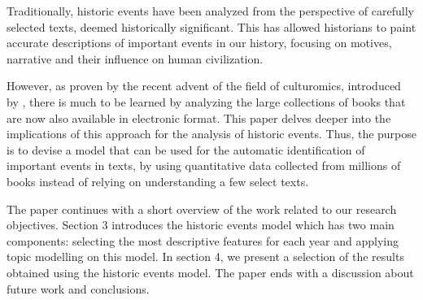 
Traditionally, historic events have been analyzed from the perspective of carefully selected texts, deemed historically significant. This has allowed historians to paint accurate descriptions of important events in our history, focusing on motives, narrative and their influence on human civilization.

However, as proven by the recent advent of the field of culturomics, introduced by , there is much to be learned by analyzing the large collections of books that are now also available in electronic format. This paper delves deeper into the implications of this approach for the analysis of historic events. Thus, the purpose is to devise a model that can be used for the automatic identification of important events in texts, by using quantitative data collected from millions of books instead of relying on understanding a few select texts. 

The paper continues with a short overview of the work related to our research objectives. Section 3 introduces the historic events model which has two main components: selecting the most descriptive features for each year and applying topic modelling on this model. In section 4, we present a selection of the results obtained using the historic events model. The paper ends with a discussion about future work and conclusions.

